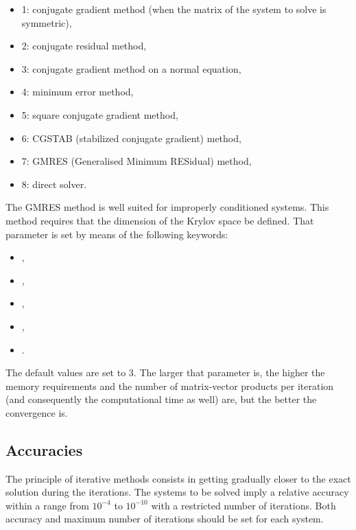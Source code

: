 \begin{itemize}
\item 1: conjugate gradient method (when the matrix of the system to solve
is symmetric),

\item 2: conjugate residual method,

\item 3: conjugate gradient method on a normal equation,

\item 4: minimum error method,

\item 5: square conjugate gradient method,

\item 6: CGSTAB (stabilized conjugate gradient) method,

\item 7: GMRES (Generalised Minimum RESidual) method,

\item 8: direct solver.
\end{itemize}

The GMRES method is well suited for improperly conditioned systems. This method
requires that the dimension of the Krylov space be defined. That parameter is
set by means of the following keywords:

\begin{itemize}
\item {},

\item {},

\item {},

\item {},

\item {}.
\end{itemize}

The default values are set to 3. The larger that parameter is, the higher the
memory requirements and the number of matrix-vector products per iteration (and
consequently the computational time as well) are, but the better the
convergence is.

\subsection{Accuracies}
\label{sec:accuracy}
The principle of iterative methods consists in getting gradually closer to the
exact solution during the iterations. The systems to be solved imply a relative
accuracy within a range from $10^{-4}$ to $10^{-10}$ with a restricted
number of iterations. Both accuracy and maximum number of iterations should be
set for each system.


